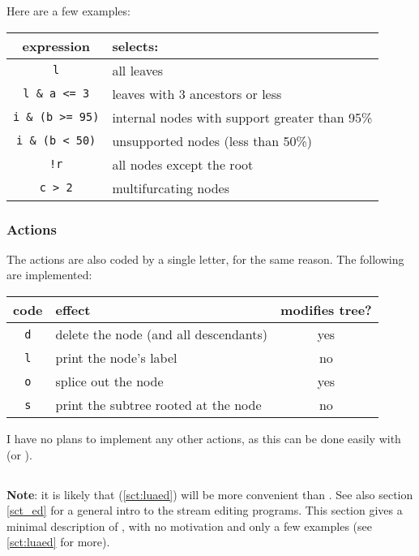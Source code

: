 \noindent{}Here are a few examples:

\begin{center}
\begin{tabular}{cl}
expression & selects: \\
\hline
\texttt{l} & all leaves \\
\texttt{l \& a <= 3} & leaves with 3 ancestors or less \\
\texttt{i \& (b >= 95)} & internal nodes with support greater than 95\% \\ 
\texttt{i \& (b < 50)} & unsupported nodes (less than 50\%) \\
\texttt{!r} & all nodes except the root \\
\texttt{c > 2} & multifurcating nodes
\end{tabular}
\end{center}

\subsubsection{Actions}

The actions are also coded by a single letter, for the same reason. The following are implemented:

\begin{center}
\begin{tabular}{clc}
code & effect & modifies tree?\\
\hline
\texttt{d} & delete the node (and all descendants) & yes \\
\texttt{l} & print the node's label & no \\
\texttt{o} & splice out the node & yes \\
\texttt{s} & print the subtree rooted at the node & no \\
\end{tabular}
\end{center}

I have no plans to implement any other actions, as this can be done easily
with \luaed{} (or \sched).

\subsection{\sched}

\textbf{Note}: it is likely that \luaed{} (\ref{sct:luaed}) will be more
convenient than \sched. See also section \ref{sct_ed} for a general intro to the
stream editing programs. This section gives a minimal description of \sched,
with no motivation and only a few examples (see \ref{sct:luaed} for more).

